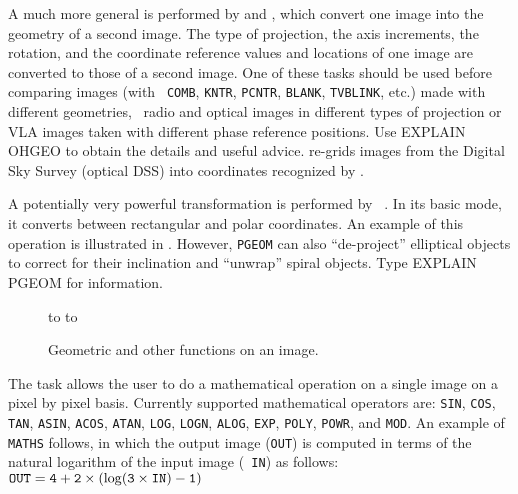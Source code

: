      A much more general  is performed
by {\tt {}} and  {\tt {}}, which convert one image
into the geometry of a second image.  The type of projection, the axis
increments, the rotation, and the coordinate reference values and
locations of one image are converted to those of a second image. One
of these tasks should be used before comparing images (with {\tt
COMB}, {\tt KNTR}, {\tt PCNTR}, {\tt BLANK}, {\tt TVBLINK}, etc.) made
with different geometries, \ie\ radio and optical images in different
types of projection or VLA images taken with different phase reference
positions.  Use {\us EXPLAIN OHGEO \CR} to obtain the details and
useful advice.  {\tt {}} re-grids images from the Digital Sky
Survey (optical DSS) into coordinates recognized by \hbox{\AIPS}.

     A  potentially very powerful transformation is performed by {\tt
{}}. In its basic mode, it converts between rectangular and
polar coordinates. An example of this operation is illustrated in
.  However, {\tt PGEOM} can also ``de-project''
elliptical objects to correct for their inclination and ``unwrap''
spiral objects.  Type {\us EXPLAIN PGEOM \CR} for information.

\begin{figure}
\centering
\vspace{6pt}
\hbox to 
\vfill
\vspace{6pt}
\hbox to 
\caption{Geometric and other functions on an image.}
\label{fig:analplot}
\end{figure}


The task {\tt {}} allows the user to do a mathematical
operation on a single image on a pixel by pixel basis.  Currently
supported mathematical operators are: {\tt SIN}, {\tt COS}, {\tt TAN},
{\tt ASIN}, {\tt ACOS}, {\tt ATAN}, {\tt LOG}, {\tt LOGN}, {\tt ALOG},
{\tt EXP}, {\tt POLY}, {\tt POWR}, and \hbox{{\tt MOD}}.  An example
of {\tt MATHS} follows, in which the output image ({\tt OUT}) is
computed in terms of the natural logarithm of the input image ({\tt
IN}) as follows: $\tt OUT = 4 + 2\times (\log(3\times IN) - 1)$

